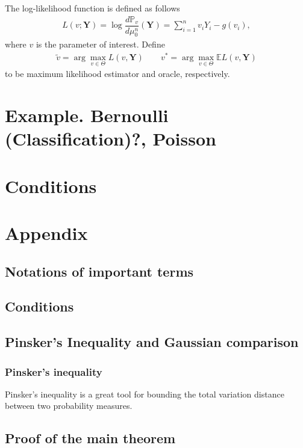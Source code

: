 \documentclass[12pt]{article}
\renewcommand{\=}[1]{\stackrel{#1}{=}} %
\begin{document}
\par The log-likelihood function is defined as follows 
\begin{align}\label{real}
L(v; \mathbf{Y}) = \log \dfrac {d \mathbb{P}_{v}}{d\mu_0^n}(\mathbf{Y}) = \sum_{i=1}^n v_i Y_i - g(v_i),
\end{align}
where $v$ is the parameter of interest. Define 
\begin{align}
\tilde{v} = \arg\max_{v \in \Theta} L(v, \mathbf{Y}) \qquad v^* = \arg\max_{v \in \Theta} \mathbb{E} L(v, \mathbf{Y}) 
\end{align}
to be maximum likelihood estimator and oracle, respectively. 

\section{Example. Bernoulli (Classification)?, Poisson}
\section{Conditions}
\section*{Appendix} 
\subsection*{Notations of important terms} 
\subsection*{Conditions} 
\subsection*{Pinsker's Inequality and Gaussian comparison}
\subsubsection*{Pinsker's inequality} 
Pinsker's inequality is a great tool for bounding the total variation distance between two probability measures. 
\subsection*{Proof of the main theorem}
\end{document}
